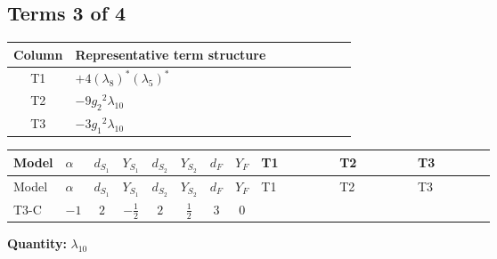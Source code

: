 \documentclass[8pt]{article}
\begin{document}
\begin{landscape}
\subsection*{Terms 3 of 4}
\begin{center}
\begin{tabular}{@{}c >{\raggedright\arraybackslash}p{0.82\linewidth}@{}}
\toprule
Column & Representative term structure \\
\midrule
T1 & \(\displaystyle +4 \left({\lambda_{8}}\right)^{*} \left({\lambda_5}\right)^{*}\) \\
\midrule
T2 & \(\displaystyle -9 {g_2}^2 {\lambda_{10}}\) \\
\midrule
T3 & \(\displaystyle -3 {g_1}^2 {\lambda_{10}}\) \\
\midrule
\bottomrule
\end{tabular}
\end{center}
\smallskip
\tiny
\begin{longtable}{@{}llcccccc >{\raggedright\arraybackslash}p{0.21\linewidth} >{\raggedright\arraybackslash}p{0.21\linewidth} >{\raggedright\arraybackslash}p{0.21\linewidth}@{}}
\toprule
Model & $\alpha$ & $d_{S_1}$ & $Y_{S_1}$ & $d_{S_2}$ & $Y_{S_2}$ & $d_F$ & $Y_F$ & T1 & T2 & T3 \\
\midrule
\endfirsthead
\toprule
Model & $\alpha$ & $d_{S_1}$ & $Y_{S_1}$ & $d_{S_2}$ & $Y_{S_2}$ & $d_F$ & $Y_F$ & T1 & T2 & T3 \\
\midrule
\endhead
T3-C & $-1$ & $2$ & $-\frac{1}{2}$ & $2$ & $\frac{1}{2}$ & $3$ & $0$ & \scriptsize\adjustbox{max width=\linewidth}{$\begin{gathered} +4 \left({\lambda_{8}}\right)^{*} \left({\lambda_5}\right)^{*}\end{gathered}$} & \scriptsize\adjustbox{max width=\linewidth}{$\begin{gathered} -9 {g_2}^2 {\lambda_{10}}\end{gathered}$} & \scriptsize\adjustbox{max width=\linewidth}{$\begin{gathered} -3 {g_1}^2 {\lambda_{10}}\end{gathered}$} \\
\midrule
\bottomrule
\end{longtable}
\clearpage
\noindent\textbf{Quantity: }$\lambda_{10}$\par\smallskip

\end{landscape}
\end{document}
